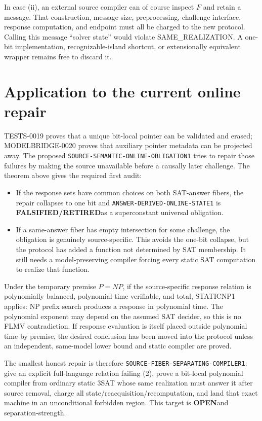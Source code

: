 \documentclass[11pt]{article}
\newcommand{\OPEN}{\textbf{OPEN}}
\newcommand{\RETIRED}{\textbf{FALSIFIED/RETIRED}}
\begin{document}
In case (ii), an external source compiler can of course inspect $F$ and retain
a message.  That construction, message size, preprocessing, challenge
interface, response computation, and endpoint must all be charged to the new
protocol.  Calling this message ``solver state'' would violate
SAME\_REALIZATION.  A one-bit implementation, recognizable-island shortcut,
or extensionally equivalent wrapper remains free to discard it.

\section{Application to the current online repair}

TESTS-0019 proves that a unique bit-local pointer can be validated and erased;
MODELBRIDGE-0020 proves that auxiliary pointer metadata can be projected away.
The proposed \texttt{SOURCE-SEMANTIC-ONLINE-OBLIGATION1} tries to repair those
failures by making the source unavailable before a causally later challenge.
The theorem above gives the required first audit:
\begin{itemize}[leftmargin=1.6em]
\item If the response sets have common choices on both SAT-answer fibers, the
repair collapses to one bit and \texttt{ANSWER-DERIVED-ONLINE-STATE1} is
\RETIRED as a superconstant universal obligation.
\item If a same-answer fiber has empty intersection for some challenge, the
obligation is genuinely source-specific.  This avoids the one-bit collapse,
but the protocol has added a function not determined by SAT membership.  It
still needs a model-preserving compiler forcing every static SAT computation
to realize that function.
\end{itemize}

Under the temporary premise $P=NP$, if the source-specific response relation
is polynomially balanced, polynomial-time verifiable, and total, STATICNP1
applies: NP prefix search produces a response in polynomial time.  The
polynomial exponent may depend on the assumed SAT decider, so this is no
FLMV contradiction.  If response evaluation is itself placed outside
polynomial time by premise, the desired conclusion has been moved into the
protocol unless an independent, same-model lower bound and static compiler
are proved.

The smallest honest repair is therefore
\texttt{SOURCE-FIBER-SEPARATING-COMPILER1}: give an explicit full-language
relation failing (2), prove a bit-local polynomial compiler from ordinary
static 3SAT whose same realization must answer it after source removal, charge
all state/reacquisition/recomputation, and land that exact machine in an
unconditional forbidden region.  This target is \OPEN and
separation-strength.
\end{document}
